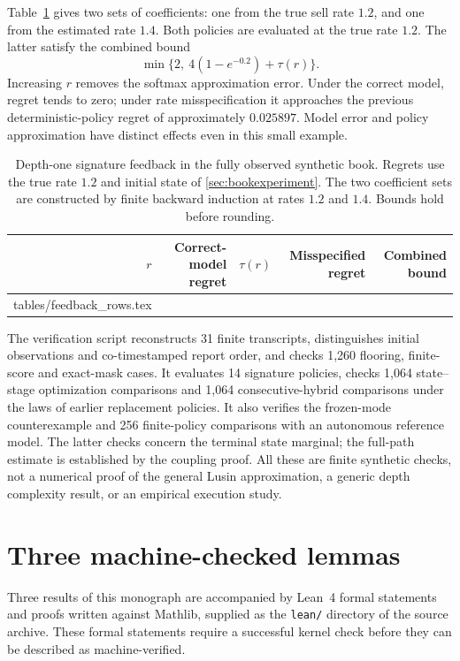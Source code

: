 \documentclass[11pt]{article}
\makeatletter
\numberwithin{equation}{section}
\theoremstyle{definition}
\theoremstyle{remark}
\newif\ifleanverified
\theoremstyle{definition}
\newcommand{\inputtable}[1]{\@@input#1 }
\makeatother
\begin{document}
Table~\ref{tab:feedback} gives two sets of coefficients: one from the true
sell rate $1.2$, and one from the estimated rate $1.4$. Both policies are
evaluated at the true rate $1.2$. The latter satisfy the combined bound
\[
 \min\{2,\ 4(1-e^{-0.2})+\tau(r)\}.
\]
Increasing $r$ removes the softmax approximation error. Under the correct
model, regret tends to zero; under rate misspecification it approaches the
previous deterministic-policy regret of approximately $0.025897$.
Model error and policy approximation have distinct effects even in this
small example.

\begin{table}[tb]
\centering\small
\caption{Depth-one signature feedback in the fully observed synthetic book.
Regrets use the true rate $1.2$ and initial state of \cref{sec:bookexperiment}.
The two coefficient sets are constructed by finite backward induction at
rates $1.2$ and $1.4$. Bounds hold before rounding.}
\label{tab:feedback}
\begin{tabular}{rrrrr}
\toprule
$r$ & Correct-model regret & $\tau(r)$ & Misspecified regret & Combined bound\\
\midrule
\inputtable{tables/feedback_rows.tex}
\bottomrule
\end{tabular}
\end{table}

The verification script reconstructs 31 finite transcripts, distinguishes
initial observations and co-timestamped report order, and checks 1,260
flooring, finite-score and exact-mask cases. It evaluates 14 signature
policies, checks 1,064 state--stage optimization comparisons and 1,064
consecutive-hybrid comparisons under the laws of earlier replacement
policies. It also verifies the frozen-mode counterexample and 256
finite-policy comparisons with an autonomous reference model. The latter
checks concern the terminal state marginal; the full-path estimate is
established by the coupling proof. All these are finite synthetic checks,
not a numerical proof of the general Lusin approximation, a generic depth
complexity result, or an empirical execution study.

\section{Three machine-checked lemmas}\label{app:lean}

\ifleanverified
Three results of this monograph are formalised in Lean~4 against Mathlib and
checked by the Lean kernel. The artifact is the \texttt{lean/} directory of
the source archive, pinned to Lean~4.19.0 and Mathlib v4.19.0. The reported
axioms for each theorem are contained in the standard set
\{\texttt{propext}, \texttt{Classical.choice}, \texttt{Quot.sound}\};
the development contains no \texttt{sorry}. The build and axiom logs
are supplied with \texttt{lean/COMPILE.md}.
\else
Three results of this monograph are accompanied by Lean~4 formal statements
and proofs written against Mathlib, supplied as the \texttt{lean/} directory
of the source archive. These formal statements require a successful kernel
check before they can be described as machine-verified.
\fi
\end{document}
